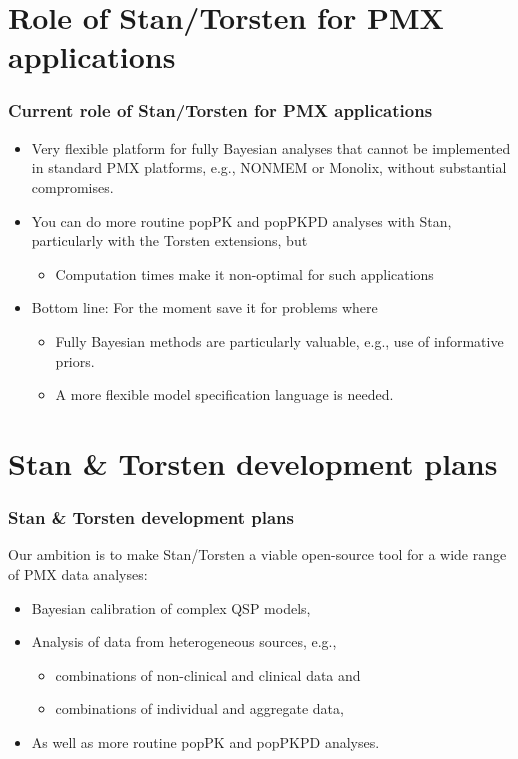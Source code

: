 \documentclass{beamer}
\begin{document}
\section{Role of Stan/Torsten for PMX applications}

\begin{frame}
  \frametitle{Current role of Stan/Torsten for PMX applications}
    
  \begin{itemize}
  \item<1-> Very flexible platform for fully Bayesian analyses that cannot
    be implemented in standard PMX platforms, e.g., NONMEM or Monolix,
    without substantial compromises.
  \item<2-> You can do more routine popPK and popPKPD analyses with Stan,
    particularly with the Torsten extensions, but
    \begin{itemize}
    \item Computation times make it non-optimal for such applications
    \end{itemize}
  \item<3-> Bottom line: For the moment save it for problems where
    \begin{itemize}
    \item Fully Bayesian methods are particularly valuable, e.g., use of
      informative priors.
    \item A more flexible model specification language is needed.
    \end{itemize}
  \end{itemize}

\end{frame}

\section{Stan \& Torsten development plans}

\begin{frame}
  \frametitle{Stan \& Torsten development plans}

Our ambition is to make Stan/Torsten a viable open-source tool for
  a wide range of PMX data analyses:
  \begin{itemize}
  \item<2-> Bayesian calibration of complex QSP models,
    \item<3-> Analysis of data from heterogeneous sources, e.g.,
  \begin{itemize}
  \item<3-> combinations of non-clinical and clinical data and
    \item<3-> combinations of individual and aggregate data,
    \end{itemize}
    \item<4-> As well as more routine popPK and popPKPD analyses.
  \end{itemize}

\end{frame}
\end{document}
